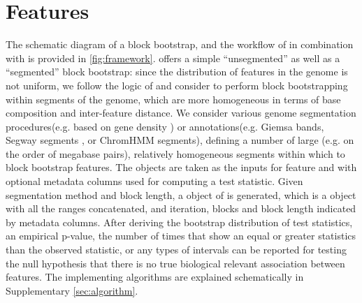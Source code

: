\vspace*{-20pt}

\section{Features}
The schematic diagram of a block bootstrap, and the workflow of \bootranges in combination with \plyranges is provided in \cref{fig:framework}. \bootranges offers a simple ``unsegmented'' as well as a ``segmented'' block bootstrap:
since the distribution of features in the genome is not uniform, we follow the logic of \citet{bickel2010subsampling} and consider to perform block bootstrapping within segments of the genome, which are more homogeneous in terms of base composition and inter-feature distance.
We consider various genome segmentation procedures(e.g. based on gene density ) or annotations(e.g. Giemsa bands, 
Segway segments \citep{hoffman:Segway}, or ChromHMM segments\citep{ernst2012chromhmm}), defining a number of large (e.g. on the order of megabase pairs), relatively homogeneous segments within which to block bootstrap features.
The \GRanges objects are taken as the inputs for feature  and  with optional metadata columns used for computing a test statistic. Given segmentation method and block length, a \bootranges object of  is generated, which is a \GRanges object with all the ranges concatenated, and iteration, blocks and block length indicated by metadata columns. 
After deriving the bootstrap distribution of test statistics, an empirical p-value, the number of times that show an equal or greater statistics than the observed statistic, or any types of intervals can be reported for testing the null hypothesis that there is no true biological relevant association between features. 
The \bootranges implementing algorithms are explained schematically in Supplementary \cref{sec:algorithm}.

